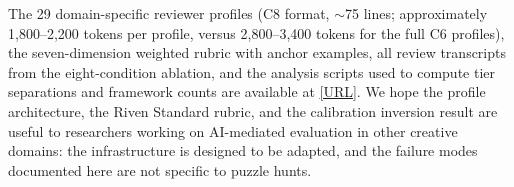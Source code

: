 The 29 domain-specific reviewer profiles (C8 format, $\sim$75 lines; approximately 1,800--2,200 tokens per profile, versus 2,800--3,400 tokens for the full C6 profiles), the seven-dimension
weighted rubric with anchor examples, all review transcripts from the eight-condition
ablation, and the analysis scripts used to compute tier separations and framework counts
are available at \url{[URL]}. We hope the profile architecture, the Riven Standard rubric,
and the calibration inversion result are useful to researchers working on AI-mediated
evaluation in other creative domains: the infrastructure is designed to be adapted, and the
failure modes documented here are not specific to puzzle hunts.
